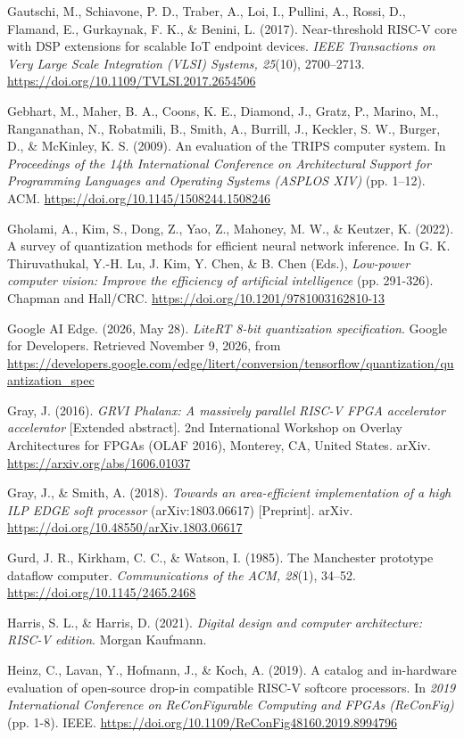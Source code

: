 \begin{apareferences}
Gautschi, M., Schiavone, P. D., Traber, A., Loi, I., Pullini, A., Rossi, D., Flamand, E., Gurkaynak, F. K., \& Benini, L. (2017). Near-threshold RISC-V core with DSP extensions for scalable IoT endpoint devices. \emph{IEEE Transactions on Very Large Scale Integration (VLSI) Systems, 25}(10), 2700–2713. \url{https://doi.org/10.1109/TVLSI.2017.2654506}

Gebhart, M., Maher, B. A., Coons, K. E., Diamond, J., Gratz, P., Marino, M., Ranganathan, N., Robatmili, B., Smith, A., Burrill, J., Keckler, S. W., Burger, D., \& McKinley, K. S. (2009). An evaluation of the TRIPS computer system. In \emph{Proceedings of the 14th International Conference on Architectural Support for Programming Languages and Operating Systems (ASPLOS XIV)} (pp. 1–12). ACM. \url{https://doi.org/10.1145/1508244.1508246}

Gholami, A., Kim, S., Dong, Z., Yao, Z., Mahoney, M. W., \& Keutzer, K. (2022). A survey of quantization methods for efficient neural network inference. In G. K. Thiruvathukal, Y.-H. Lu, J. Kim, Y. Chen, \& B. Chen (Eds.), \emph{Low-power computer vision: Improve the efficiency of artificial intelligence} (pp. 291-326). Chapman and Hall/CRC. \url{https://doi.org/10.1201/9781003162810-13}

Google AI Edge. (2026, May 28). \emph{LiteRT 8-bit quantization specification}. Google for Developers. Retrieved November 9, 2026, from \url{https://developers.google.com/edge/litert/conversion/tensorflow/quantization/quantization_spec}

Gray, J. (2016). \emph{GRVI Phalanx: A massively parallel RISC-V FPGA accelerator accelerator} {[}Extended abstract{]}. 2nd International Workshop on Overlay Architectures for FPGAs (OLAF 2016), Monterey, CA, United States. arXiv. \url{https://arxiv.org/abs/1606.01037}

Gray, J., \& Smith, A. (2018). \emph{Towards an area-efficient implementation of a high ILP EDGE soft processor} (arXiv:1803.06617) {[}Preprint{]}. arXiv. \url{https://doi.org/10.48550/arXiv.1803.06617}

Gurd, J. R., Kirkham, C. C., \& Watson, I. (1985). The Manchester prototype dataflow computer. \emph{Communications of the ACM, 28}(1), 34–52. \url{https://doi.org/10.1145/2465.2468}

Harris, S. L., \& Harris, D. (2021). \emph{Digital design and computer architecture: RISC-V edition}. Morgan Kaufmann.

Heinz, C., Lavan, Y., Hofmann, J., \& Koch, A. (2019). A catalog and in-hardware evaluation of open-source drop-in compatible RISC-V softcore processors. In \emph{2019 International Conference on ReConFigurable Computing and FPGAs (ReConFig)} (pp. 1-8). IEEE. \url{https://doi.org/10.1109/ReConFig48160.2019.8994796}


\end{apareferences}
